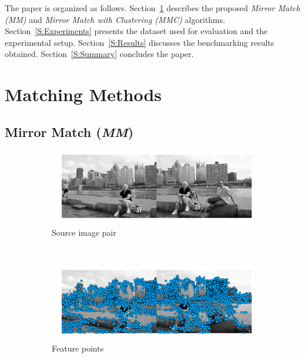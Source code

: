 \documentclass[conference]{IEEEtran}
\begin{document}
The paper is organized as follows.  Section~\ref{S:MatchingMethods} 
describes the proposed \emph{Mirror Match (MM)} and \emph{Mirror Match 
with Clustering (MMC)} algorithms.  Section~\ref{S:Experiments} presents 
the dataset used for evaluation and the experimental setup.  
Section~\ref{S:Results} discusses the benchmarking results obtained.  
Section~\ref{S:Summary} concludes the paper.  

\section{Matching Methods}
\label{S:MatchingMethods}
%
\subsection{Mirror Match (\emph{MM})}
%
\begin{figure}
	\centering%
        \begin{subfigure}[t]{\columnwidth}
			\centering
			\includegraphics[width=0.85\columnwidth]{images/MMC_pitts_source}
			\caption{Source image pair}
			\label{fig:pitts_source}
		\end{subfigure}%
		\\ %
        \begin{subfigure}[t]{\columnwidth}
			\centering
			\includegraphics[width=0.85\columnwidth]{images/MMC_pitts_keypoints}
			\caption{Feature points}
			\label{fig:pitts_keypoints}
		\end{subfigure}%
		\\ %
        \begin{subfigure}[t]{\columnwidth}

\end{subfigure}
\end{figure}
\end{document}
